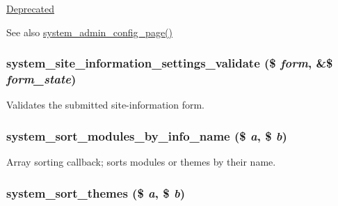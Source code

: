 \begin{Desc}
\item[\hyperlink{deprecated__deprecated000004}{Deprecated}]\end{Desc}
\begin{DoxySeeAlso}{See also}
\hyperlink{system_8admin_8inc_a5da84f893a839fab8b3d748ecb52de9d}{system\_\-admin\_\-config\_\-page()} 
\end{DoxySeeAlso}
\hypertarget{system_8admin_8inc_abf9e67e3196d40a164cfacba18613b28}{
\subsubsection[{system\_\-site\_\-information\_\-settings\_\-validate}]{\setlength{\rightskip}{0pt plus 5cm}system\_\-site\_\-information\_\-settings\_\-validate (\$ {\em form}, \/  \&\$ {\em form\_\-state})}}
\label{system_8admin_8inc_abf9e67e3196d40a164cfacba18613b28}
Validates the submitted site-\/information form. \hypertarget{system_8admin_8inc_aff1678b51b0d78a4c27b8e05b4f6621b}{
\subsubsection[{system\_\-sort\_\-modules\_\-by\_\-info\_\-name}]{\setlength{\rightskip}{0pt plus 5cm}system\_\-sort\_\-modules\_\-by\_\-info\_\-name (\$ {\em a}, \/  \$ {\em b})}}
\label{system_8admin_8inc_aff1678b51b0d78a4c27b8e05b4f6621b}
Array sorting callback; sorts modules or themes by their name. \hypertarget{system_8admin_8inc_a8770f4f3651607a040ea5e73311ea2bd}{
\subsubsection[{system\_\-sort\_\-themes}]{\setlength{\rightskip}{0pt plus 5cm}system\_\-sort\_\-themes (\$ {\em a}, \/  \$ {\em b})}}
